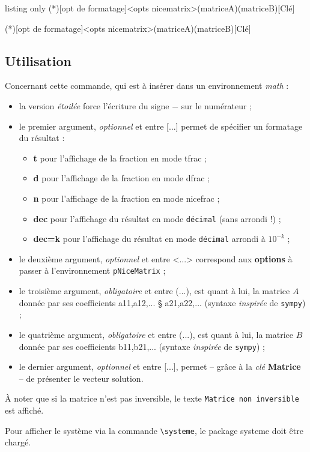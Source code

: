 \documentclass[french,a4paper,11pt]{article}
\newcommand\Cle[1]{{\bfseries\sffamily\textlangle #1\textrangle}}
\newcommand\cmaj[1]{\tcbox[vignetteMaJ]{#1}\xspace}
\begin{document}
\begin{PresentationCode}{listing only}
\SolutionSysteme(*)[opt de formatage]<opts nicematrix>(matriceA)(matriceB)[Clé]

\SolutionSystemePY(*)[opt de formatage]<opts nicematrix>(matriceA)(matriceB)[Clé]
\end{PresentationCode}

\subsection{Utilisation}

\begin{tipblock}
Concernant cette commande, qui est à insérer dans un environnement \textit{math} :

\begin{itemize}
	\item \cmaj{0.1.3} la version \textit{étoilée} force l'écriture du signe \og $-$ \fg{} sur le numérateur ;
	\item le premier argument, \textit{optionnel} et entre \textsf{[...]} permet de spécifier un formatage du résultat :
	\begin{itemize}
		\item \Cle{t} pour l'affichage de la fraction en mode \textsf{tfrac} ;
		\item \Cle{d} pour l'affichage de la fraction en mode \textsf{dfrac} ;
		\item \Cle{n} pour l'affichage de la fraction en mode \textsf{nicefrac} ;
		\item \Cle{dec} pour l'affichage du résultat en mode \texttt{décimal} (sans arrondi !) ;
		\item \Cle{dec=k} pour l'affichage du résultat en mode \texttt{décimal} arrondi à $10^{-k}$ ;
	\end{itemize}
	\item le deuxième argument, \textit{optionnel} et entre \textsf{<...>} correspond aux \Cle{options} à passer à l'environnement \texttt{pNiceMatrix} ;
	\item le troisième argument, \textit{obligatoire} et entre \textsf{(...)}, est quant à lui, la matrice $A$ donnée par ses coefficients \textsf{a11,a12,... § a21,a22,...} (syntaxe \textit{inspirée} de \texttt{sympy}) ;
	\item le quatrième argument, \textit{obligatoire} et entre \textsf{(...)}, est quant à lui, la matrice $B$ donnée par ses coefficients \textsf{b11,b21,...} (syntaxe \textit{inspirée} de \texttt{sympy}) ;
	\item le dernier argument, \textit{optionnel} et entre \textsf{[...]}, permet -- grâce à la \textit{clé} \Cle{Matrice} -- de présenter le vecteur solution.
\end{itemize}
À noter que si la matrice n'est pas inversible, le texte \texttt{Matrice non inversible} est affiché.

\smallskip

Pour afficher le système via la commande \texttt{\textbackslash systeme}, le package \textsf{systeme} doit être chargé.
\end{tipblock}
\end{document}
